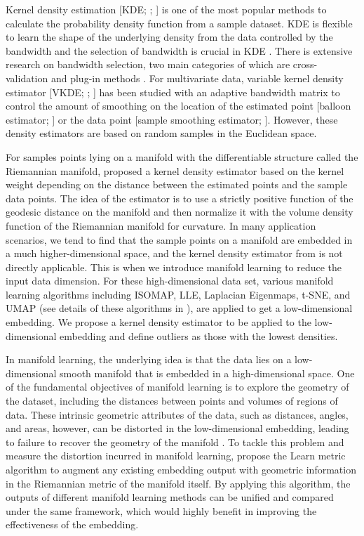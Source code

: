 \documentclass[11pt,a4paper,]{article}
\begin{document}
Kernel density estimation {[}KDE; \textcite{Parzen1962-gt}; \textcite{Chen2017-dw}{]} is one of
the most popular methods to calculate the probability density function
from a sample dataset. KDE is flexible to learn the shape of the
underlying density from the data controlled by the bandwidth and the
selection of bandwidth is crucial in KDE \autocite{Jones1990-oe,Terrell1992-ut}. There is extensive research on bandwidth selection,
two main categories of which are cross-validation \autocite{Jones1992-ta,Sain1994-gr} and plug-in methods \autocite{Wand1994-gc,Duong2003-sp}. For
multivariate data, variable kernel density estimator {[}VKDE;
\textcite{Jones1990-oe}; \textcite{Terrell1992-ut}{]} has been studied with an adaptive
bandwidth matrix to control the amount of smoothing on the location of
the estimated point {[}balloon estimator; \textcite{Terrell1992-ef}{]} or the data
point {[}sample smoothing estimator; \textcite{Terrell1992-ef}{]}. However, these
density estimators are based on random samples in the Euclidean space.

For samples points lying on a manifold with the differentiable structure
called the Riemannian manifold, \textcite{Pelletier2005-vu} proposed a kernel
density estimator based on the kernel weight depending on the distance
between the estimated points and the sample data points. The idea of the
estimator is to use a strictly positive function of the geodesic
distance on the manifold and then normalize it with the volume density
function of the Riemannian manifold for curvature. \autocite{Henry2009-ll} In
many application scenarios, we tend to find that the sample points on a
manifold are embedded in a much higher-dimensional space, and the kernel
density estimator from \textcite{Pelletier2005-vu} is not directly applicable.
This is when we introduce manifold learning to reduce the input data
dimension. For these high-dimensional data set, various manifold
learning algorithms including ISOMAP, LLE, Laplacian Eigenmaps, t-SNE,
and UMAP (see details of these algorithms in \textcite{Cheng2021-ex}), are applied
to get a low-dimensional embedding. We propose a kernel density
estimator to be applied to the low-dimensional embedding and define
outliers as those with the lowest densities.

In manifold learning, the underlying idea is that the data lies on a
low-dimensional smooth manifold that is embedded in a high-dimensional
space. One of the fundamental objectives of manifold learning is to
explore the geometry of the dataset, including the distances between
points and volumes of regions of data. These intrinsic geometric
attributes of the data, such as distances, angles, and areas, however,
can be distorted in the low-dimensional embedding, leading to failure to
recover the geometry of the manifold \autocite{Goldberg2008-co}. To tackle this
problem and measure the distortion incurred in manifold learning,
\textcite{Perrault-Joncas2013-pq} propose the Learn metric algorithm to augment
any existing embedding output with geometric information in the
Riemannian metric of the manifold itself. By applying this algorithm,
the outputs of different manifold learning methods can be unified and
compared under the same framework, which would highly benefit in
improving the effectiveness of the embedding.
\end{document}
